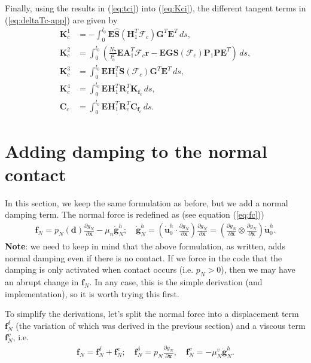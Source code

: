 \documentclass[3p]{elsarticle}
\newcommand{\vect}[1]{\boldsymbol{#1}}
\begin{document}
\noindent Finally, using the results in (\ref{eq:tci}) into (\ref{eq:Kci}), the different tangent terms in (\ref{eq:deltaTc-app}) are given by
\begin{align}
	\vect{K}_c^1 &= -\int_0^{l_0}\vect{E}\hat{\vect{S}}(\vect{H}^T_1\vect{\mathcal{F}}_c)\vect{G}^T\vect{E}^T\,ds,\\
	\vect{K}_c^2 &=\int_0^{l_0} \left(\frac{N_7}{l_n^2}\vect{E}\vect{A}_1^T\vect{\mathcal{F}}_c\vect{r}-\vect{E}\vect{G}\vect{S}(\vect{\mathcal{F}}_c)\vect{P}_1\vect{P}\vect{E}^T\right)\,ds,\\
	\vect{K}_c^3 &=\int_0^{l_0} \vect{E}\vect{H}_1^T\vect{S}(\vect{\mathcal{F}}_c)\vect{G}^T\vect{E}^T\,ds,\\
	\vect{K}_c^4 &=\int_0^{l_0}\vect{E}\vect{H}_1^T\vect{R}_e^T\vect{K}_{\vect{f}_c}\,ds,\\
	\vect{C}_c &=\int_0^{l_0}\vect{E}\vect{H}_1^T\vect{R}_e^T\vect{C}_{\vect{f}_c}\,ds.
\end{align}

\section{Adding damping to the normal contact}

In this section, we keep the same formulation as before, but we add a normal damping term. The normal force is redefined as (see equation (\ref{eq:fc}))
\begin{align}
\vect{f}_N =p_N(\vect{d})\frac{\partial g_N}{\partial\vect{x}}-\mu_{n}\dot{\vect{g}}_N^h;\quad \dot{\vect{g}}_N^h = \left(\dot{\vect{u}}_0^h\cdot\frac{\partial g_N}{\partial \vect{x}}\right)\frac{\partial g_N}{\partial \vect{x}}=\left(\frac{\partial g_N}{\partial \vect{x}}\otimes\frac{\partial g_N}{\partial \vect{x}}\right)\dot{\vect{u}}_0^h.
\end{align}
\noindent \textbf{Note}: we need to keep in mind that the above formulation, as written, adds normal damping even if there is no contact. If we force in the code that the damping is only activated when contact occurs (i.e. $p_N>0$), then we may have an abrupt change in $\vect{f}_N$. In any case, this is the simple derivation (and implementation), so it is worth trying this first.


To simplify the derivations, let's split the normal force into a displacement term $\vect{f}_N^\delta$ (the variation of which was derived in the previous section) and a viscous term $\vect{f}_N^v$, i.e.
\begin{align}
	\vect{f}_N = \vect{f}_N^\delta + \vect{f}_N^v;\quad \vect{f}_N^\delta = p_N\frac{\partial g_N}{\partial\vect{x}},\quad \vect{f}_N^v = -\mu_N^v\dot{\vect{g}}_N^h.
\end{align}
\end{document}
